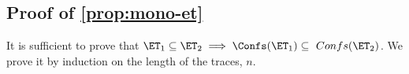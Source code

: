 
\subsection{Proof of \cref{prop:mono-et} }
It is sufficient to prove that \(\ET_1 \subseteq \ET_2 \implies \Confs(\ET_1) \subseteq\ Confs(\ET_2) \).
We prove it by induction on the length of the traces, \( n \).

